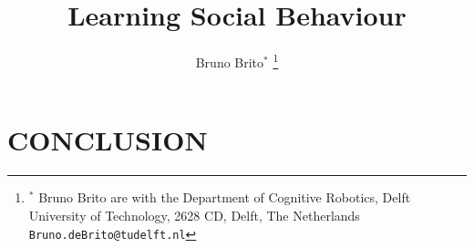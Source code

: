 \documentclass[letterpaper, 10 pt, conference]{ieeeconf}  %
\title{\LARGE \bf
Learning Social Behaviour}
\author{Bruno Brito${}^*$%
\thanks{${}^*$ Bruno Brito are with the Department of Cognitive Robotics, Delft University of Technology, 2628 CD, Delft, The Netherlands
       {\tt\small Bruno.deBrito@tudelft.nl} }
}
\begin{document}
\maketitle
\thispagestyle{empty}
\pagestyle{empty}


\begin{abstract}

\end{abstract}




\section{CONCLUSION}





\addtolength{\textheight}{-12cm}   %




 

\end{document}
